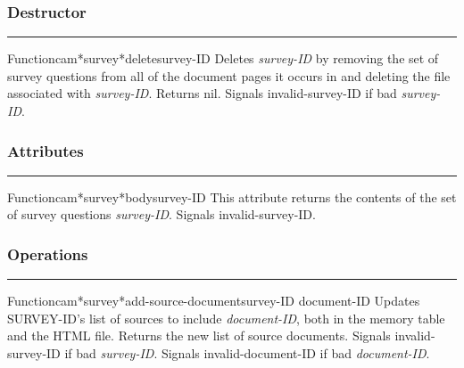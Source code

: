 \subsubsection*{Destructor}
\par\vspace*{0.00in}\par\hrule\par\medskip\par


\begin{functiondoc}{Function}{cam*survey*delete}{survey-ID}
Deletes {\em survey-ID} by removing the set of survey questions from all of the 
document pages it occurs in and deleting the file associated with {\em survey-ID}.
Returns nil.
Signals invalid-survey-ID if bad {\em survey-ID}.
\end{functiondoc}


\subsubsection*{Attributes}
\par\vspace*{0.00in}\par\hrule\par\medskip\par


\begin{functiondoc}{Function}{cam*survey*body}{survey-ID}
This attribute returns the contents of the set of survey questions {\em survey-ID}.
Signals invalid-survey-ID.
\end{functiondoc}


\subsubsection*{Operations}
\par\vspace*{0.00in}\par\hrule\par\medskip\par


\begin{functiondoc}{Function}{cam*survey*add-source-document}{survey-ID document-ID}
Updates SURVEY-ID's list of sources to include {\em document-ID}, both in the 
memory table and the HTML file.
Returns the new list of source documents.
Signals invalid-survey-ID if bad {\em survey-ID}.
Signals invalid-document-ID if bad {\em document-ID}.
\end{functiondoc}

